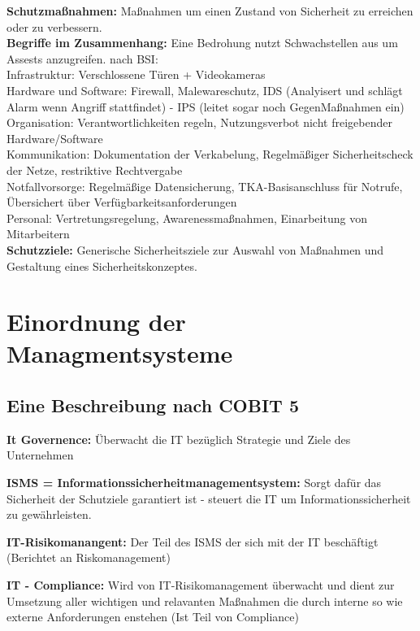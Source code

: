 \documentclass[a4paper,10pt]{scrartcl}
\begin{document}
\textbf{Schutzmaßnahmen: } Maßnahmen um einen Zustand von Sicherheit zu erreichen oder zu verbessern.
\\
\textbf{Begriffe im Zusammenhang:} Eine Bedrohung nutzt Schwachstellen aus um Assests anzugreifen.
nach BSI:\\
Infrastruktur: Verschlossene Türen + Videokameras\\
Hardware und Software: Firewall, Malewareschutz, IDS (Analyisert und schlägt Alarm wenn Angriff stattfindet) - IPS (leitet sogar noch
GegenMaßnahmen ein)\\
Organisation: Verantwortlichkeiten regeln, Nutzungsverbot nicht freigebender Hardware/Software\\
Kommunikation: Dokumentation der Verkabelung, Regelmäßiger Sicherheitscheck der Netze, restriktive Rechtvergabe\\
Notfallvorsorge: Regelmäßige Datensicherung, TKA-Basisanschluss für Notrufe, Übersichert über Verfügbarkeitsanforderungen\\
Personal: Vertretungsregelung, Awarenessmaßnahmen, Einarbeitung von Mitarbeitern\\

\textbf{Schutzziele: } Generische Sicherheitsziele zur Auswahl von
Maßnahmen und Gestaltung eines
Sicherheitskonzeptes.

\section{Einordnung der Managmentsysteme}

\subsection{Eine Beschreibung nach COBIT 5}

\textbf{It Governence: } Überwacht die IT bezüglich Strategie und Ziele des Unternehmen

\textbf{ISMS = Informationssicherheitmanagementsystem: } Sorgt dafür das Sicherheit der Schutziele garantiert ist - steuert die IT um Informationssicherheit 
zu gewährleisten.

\textbf{IT-Risikomanangent: } Der Teil des ISMS der sich mit der IT beschäftigt (Berichtet an Riskomanagement)

\textbf{IT - Compliance: } Wird von IT-Risikomanagement überwacht und dient zur Umsetzung aller wichtigen und relavanten Maßnahmen die durch
interne so wie externe Anforderungen enstehen (Ist Teil von Compliance)
\end{document}
